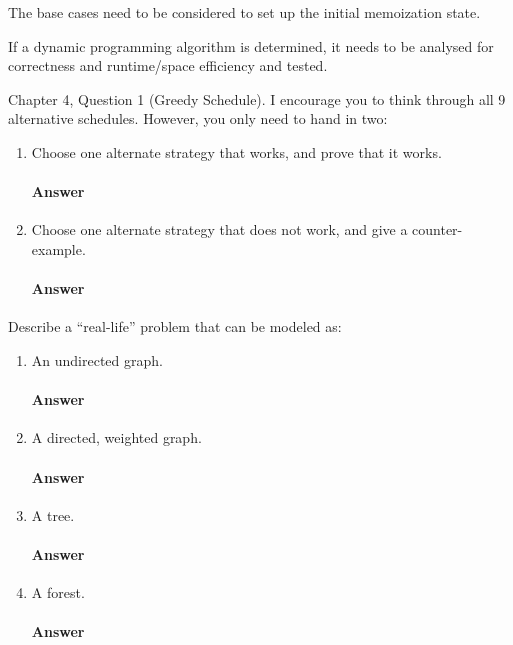\documentclass{article}
\begin{document}
The base cases need to be considered to set up the initial memoization state.

If a dynamic programming algorithm is determined, it needs to be analysed for
correctness and runtime/space efficiency and tested.


\collab{\todo{}}

Chapter 4, Question 1 (Greedy Schedule).  I encourage you to think through all 9
alternative schedules.  However, you only need to hand in two:
\begin{enumerate}
    \item Choose one alternate strategy that
        works, and prove that it works.

    \paragraph{Answer}
    \todo{}

    \item Choose one alternate strategy that does not work, and give a
        counter-example.

    \paragraph{Answer}
    \todo{}

\end{enumerate}

\collab{\todo{}}

Describe a ``real-life'' problem that can be modeled as:

\begin{enumerate}
    \item An undirected graph.

        \paragraph{Answer}
        \todo{}

    \item A directed, weighted graph.

        \paragraph{Answer}
        \todo{}

    \item A tree.

        \paragraph{Answer}
        \todo{}

    \item A forest.

        \paragraph{Answer}
        \todo{}

\end{enumerate}
\end{document}
